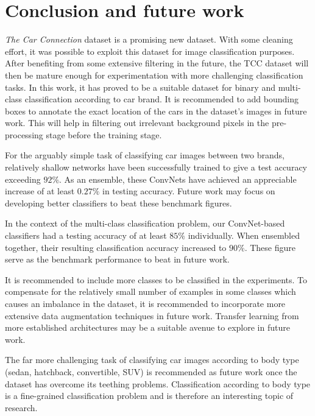 \documentclass[conference]{IEEEtran}
\begin{document}
\section{Conclusion and future work} \label{section:conclusion}
\textit{The Car Connection} dataset is a promising new dataset. With some cleaning effort, it was possible to exploit this dataset for image classification purposes. After benefiting from some extensive filtering in the future, the TCC dataset will then be mature enough for experimentation with more challenging classification tasks. In this work, it has proved to be a suitable dataset for binary and multi-class classification according to car brand. It is recommended to add bounding boxes to annotate the exact location of the cars in the dataset's images in future work. This will help in filtering out irrelevant background pixels in the pre-processing stage before the training stage.

For the arguably simple task of classifying car images between two brands, relatively shallow networks have been successfully trained to give a test accuracy exceeding $92\%$. As an ensemble, these ConvNets have achieved an appreciable increase of at least $0.27\%$ in testing accuracy. Future work may focus on developing better classifiers to beat these benchmark figures.

In the context of the multi-class classification problem, our ConvNet-based classifiers had a testing accuracy of at least $85\%$ individually. When ensembled together, their resulting classification accuracy increased to $90\%$. These figure serve as the benchmark performance to beat in future work.

It is recommended to include more classes to be classified in the experiments. To compensate for the relatively small number of examples in some classes which causes an imbalance in the dataset, it is recommended to incorporate more extensive data augmentation techniques in future work. Transfer learning from more established architectures may be a suitable avenue to explore in future work.

The far more challenging task of classifying car images according to body type (sedan, hatchback, convertible, SUV) is recommended as future work once the dataset has overcome its teething problems. Classification according to body type is a fine-grained classification problem and is therefore an interesting topic of research.
\end{document}
